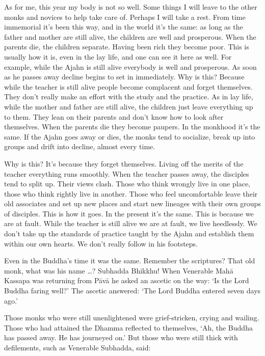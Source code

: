 As for me, this year my body is not so well. Some things I will leave to the other monks and novices to help take care of. Perhaps I will take a rest. From time immemorial it's been this way, and in the world it's the same: as long as the father and mother are still alive, the children are well and prosperous. When the parents die, the children separate. Having been rich they become poor. This is usually how it is, even in the lay life, and one can see it here as well. For example, while the Ajahn is still alive everybody is well and prosperous. As soon as he passes away decline begins to set in immediately. Why is this? Because while the teacher is still alive people become complacent and forget themselves. They don't really make an effort with the study and the practice. As in lay life, while the mother and father are still alive, the children just leave everything up to them. They lean on their parents and don't know how to look after themselves. When the parents die they become paupers. In the monkhood it's the same. If the Ajahn goes away or dies, the monks tend to socialize, break up into groups and drift into decline, almost every time.

Why is this? It's because they forget themselves. Living off the merits of the teacher everything runs smoothly. When the teacher passes away, the disciples tend to split up. Their views clash. Those who think wrongly live in one place, those who think rightly live in another. Those who feel uncomfortable leave their old associates and set up new places and start new lineages with their own groups of disciples. This is how it goes. In the present it's the same. This is because we are at fault. While the teacher is still alive we are at fault, we live heedlessly. We don't take up the standards of practice taught by the Ajahn and establish them within our own hearts. We don't really follow in his footsteps.

Even in the Buddha's time it was the same. Remember the scriptures? That old monk, what was his name \ldots{}? Subhadda Bhikkhu! When Venerable Mah\=a Kassapa was returning from P\=av\=a he asked an ascetic on the way: `Is the Lord Buddha faring well?' The ascetic answered: `The Lord Buddha entered  seven days ago.'

Those monks who were still unenlightened were grief-stricken, crying and wailing. Those who had attained the Dhamma reflected to themselves, `Ah, the Buddha has passed away. He has journeyed on.' But those who were still thick with defilements, such as Venerable Subhadda, said:

